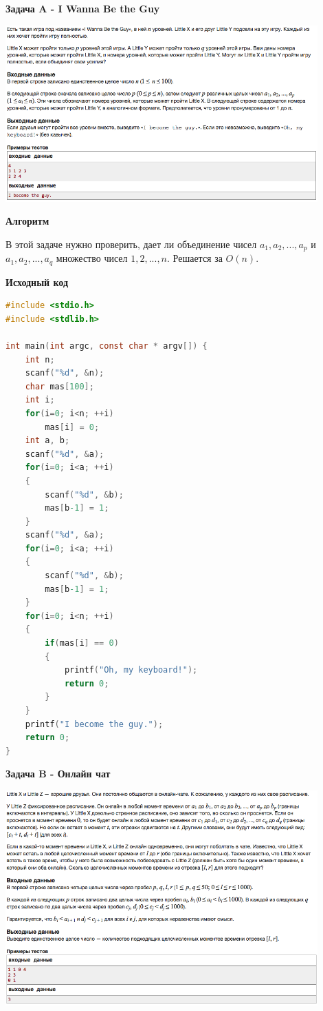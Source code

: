 \documentclass[a4paper,12pt]{article}
\begin{document}
\newpage
\textbf{{\large Задача A - I Wanna Be the Guy}} \\
\begin{center}
\includegraphics[width=0.9\textwidth]{C_268/C_268_A.png}\\ [1cm]
\end{center}

\textbf{{\large Алгоритм}}

В этой задаче нужно проверить, дает ли объединение чисел $a_1, a_2, ... , a_p$ и $a_1, a_2, ... , a_q$ множество чисел $1, 2, ... , n$. Решается за $O(n)$.

\newpage
\textbf{{\large Исходный код}} \\
\begin{lstlisting}[language=C]
#include <stdio.h>
#include <stdlib.h>

int main(int argc, const char * argv[]) {
    int n;
    scanf("%d", &n);
    char mas[100];
    int i;
    for(i=0; i<n; ++i)
        mas[i] = 0;
    int a, b;
    scanf("%d", &a);
    for(i=0; i<a; ++i)
    {
        scanf("%d", &b);
        mas[b-1] = 1;
    }
    scanf("%d", &a);
    for(i=0; i<a; ++i)
    {
        scanf("%d", &b);
        mas[b-1] = 1;
    }
    for(i=0; i<n; ++i)
    {
        if(mas[i] == 0)
        {
            printf("Oh, my keyboard!");
            return 0;
        }
    }
    printf("I become the guy.");
    return 0;
}
\end{lstlisting}

\newpage
\textbf{{\large Задача B - Онлайн чат}} \\
\begin{center}
\includegraphics[width=0.9\textwidth]{C_268/C_268_B.png}\\ [1cm]
\end{center}
\end{document}
